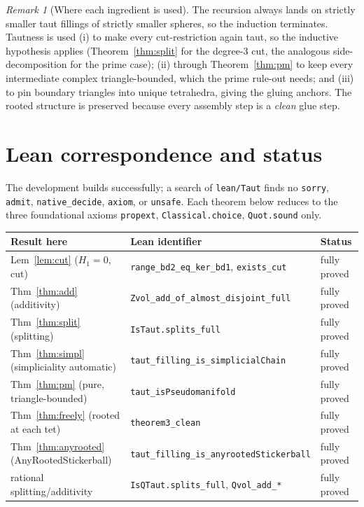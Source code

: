 \documentclass[11pt]{article}
\theoremstyle{plain}
\theoremstyle{definition}
\theoremstyle{remark}
\newtheorem*{remark}{Remark}
\newcommand{\code}[1]{\texttt{#1}}
\begin{document}
\begin{remark}[Where each ingredient is used]
The recursion always lands on strictly smaller taut fillings of strictly smaller spheres,
so the induction terminates. Tautness is used (i) to make every cut-restriction again taut,
so the inductive hypothesis applies (Theorem~\ref{thm:split} for the degree-$3$ cut, the
analogous side-decomposition for the prime case); (ii) through
Theorem~\ref{thm:pm} to keep every intermediate complex triangle-bounded, which the prime
rule-out needs; and (iii) to pin boundary triangles into unique tetrahedra, giving the
gluing anchors. The rooted structure is preserved because every assembly step is a
\emph{clean} glue step.
\end{remark}

\section{Lean correspondence and status}\label{sec:status}

The development builds successfully; a search of \code{lean/Taut} finds no \code{sorry},
\code{admit}, \code{native\_decide}, \code{axiom}, or \code{unsafe}. Each theorem below
reduces to the three foundational axioms \code{propext}, \code{Classical.choice},
\code{Quot.sound} only.

\begin{center}\small
\begin{tabular}{lll}
\hline
Result here & Lean identifier & Status\\
\hline
Lem~\ref{lem:cut} ($H_1=0$, cut) & \code{range\_bd2\_eq\_ker\_bd1}, \code{exists\_cut} & fully proved\\
Thm~\ref{thm:add} (additivity) & \code{Zvol\_add\_of\_almost\_disjoint\_full} & fully proved\\
Thm~\ref{thm:split} (splitting) & \code{IsTaut.splits\_full} & fully proved\\
Thm~\ref{thm:simpl} (simpliciality automatic) & \code{taut\_filling\_is\_simplicialChain} & fully proved\\
Thm~\ref{thm:pm} (pure, triangle-bounded) & \code{taut\_isPseudomanifold} & fully proved\\
Thm~\ref{thm:freely} (rooted at each tet) & \code{theorem3\_clean} & fully proved\\
Thm~\ref{thm:anyrooted} (AnyRootedStickerball) & \code{taut\_filling\_is\_anyrootedStickerball} & fully proved\\
rational splitting/additivity & \code{IsQTaut.splits\_full}, \code{Qvol\_add\_*} & fully proved\\
\hline
\end{tabular}
\end{center}
\end{document}
